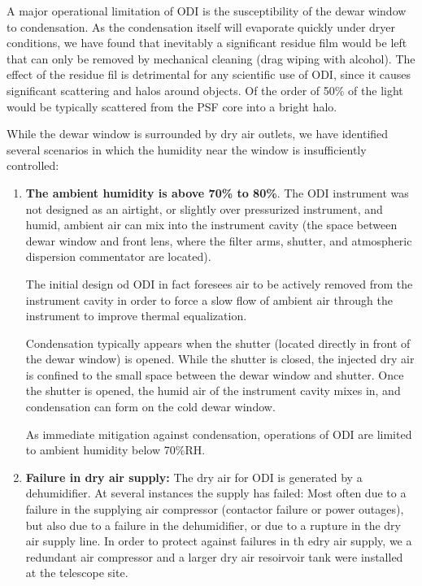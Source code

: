 \documentclass[]{spieman}
\begin{document}
A major operational limitation of ODI is the susceptibility of the dewar window
to condensation. As the condensation itself will evaporate quickly under dryer
conditions, we have found that inevitably a significant residue film would be
left that can only be removed by mechanical cleaning (drag wiping with alcohol).
The effect of the residue fil is detrimental for any scientific use of ODI,
since it causes significant scattering and halos around objects. Of the order of
50\%  of the light would be typically scattered from the PSF core into a bright
halo.

While the dewar window is surrounded by dry air outlets, we have identified
several scenarios in which the humidity near the window is insufficiently
controlled:

\begin{enumerate}
	\item {\bf The ambient humidity is above 70\% to 80\%}. The ODI instrument 
	was not designed as an airtight, or slightly over pressurized instrument, 
	and humid, ambient air can mix into the instrument cavity (the space 
	between dewar window and front lens, where the filter arms, shutter, and 
	atmospheric dispersion commentator are located).
	
	The initial design od ODI in fact foresees air to be actively removed from 
	the instrument cavity in order to force a slow flow of ambient air through 
	the instrument to improve thermal equalization. 
	
	Condensation typically appears when the shutter (located directly in front 
	of the dewar window) is opened. While the shutter is closed, the injected 
	dry air is confined to the small space between the dewar window and 
	shutter. Once the shutter is opened, the  humid air of the instrument 
	cavity mixes in, and condensation can form on the cold dewar window. 
	
	As immediate mitigation against condensation, operations of ODI are limited 
	to ambient humidity below 70\%RH.
	
	\item {\bf Failure in dry air supply:} The dry air for ODI is generated by 
	a dehumidifier. At several instances the supply has failed: Most often due 
	to a failure in the supplying air compressor (contactor failure or power 
	outages), but also due to a failure in the dehumidifier, or due to a 
	rupture in the dry air supply line. In order to protect against failures in 
	th edry air supply, we a redundant air compressor and a larger dry air 
	resoirvoir tank were installed at the telescope site. 

\end{enumerate}
\end{document}
